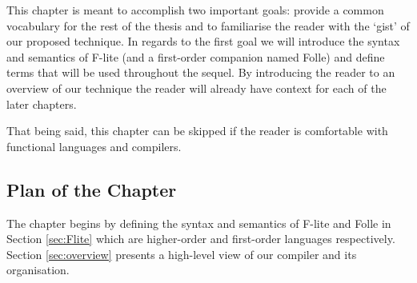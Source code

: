 This chapter is meant to accomplish two important goals: provide a common
vocabulary for the rest of the thesis and to familiarise the reader with the
`gist' of our proposed technique. In regards to the first goal we will
introduce the syntax and semantics of F-lite (and a first-order companion named
Folle) and define terms that will be used throughout the sequel. By introducing
the reader to an overview of our technique the reader will already have context
for each of the later chapters.

That being said, this chapter can be skipped if the reader is comfortable with
functional languages and compilers.

\subsection{Plan of the Chapter}

The chapter begins by defining the syntax and semantics of F-lite and Folle in
Section \ref{sec:Flite} which are higher-order and first-order languages
respectively. Section \ref{sec:overview} presents a high-level view of our
compiler and its organisation.
